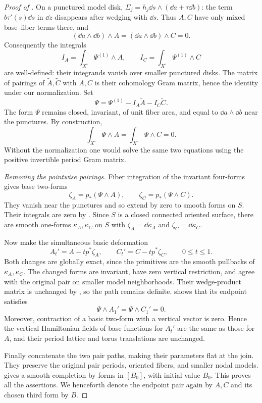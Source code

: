 \begin{proof}[Proof of ]
On a punctured model disk, $\Sigma_j=h_j\dd s\wedge(\dd a+\tau\dd b)$:
the term $b\tau'(s)\dd s$ in $\dd z$ disappears after wedging with
$\dd s$.  Thus $A,C$ have only mixed base--fiber terms there, and
\[
 (\dd a\wedge\dd b)\wedge A
 =(\dd a\wedge\dd b)\wedge C=0.
\]
Consequently the integrals
\[
 I_A=\int_{X^\circ}\Psi^{(1)}\wedge A,
 \qquad
 I_C=\int_{X^\circ}\Psi^{(1)}\wedge C
\]
are well-defined: their integrands vanish over smaller punctured
disks.  The matrix of pairings of $\widetilde A,\widetilde C$ with
$A,C$ is their cohomology Gram matrix, hence the identity under our
normalization.  Set
\begin{equation}\label{eq:regular-psi-class-correction}
 \Psi=\Psi^{(1)}-I_A\widetilde A-I_C\widetilde C.
\end{equation}
The form $\Psi$ remains closed, invariant, of unit fiber area, and
equal to $\dd a\wedge\dd b$ near the punctures.  By construction,
\begin{equation}\label{eq:regular-zero-total-pairings}
 \int_{X^\circ}\Psi\wedge A
 =\int_{X^\circ}\Psi\wedge C=0.
\end{equation}
Without the normalization one would solve the same two equations
using the positive invertible period Gram matrix.

\emph{Removing the pointwise pairings.}
Fiber integration of the invariant four-forms gives base two-forms
\[
 \zeta_A=p_*(\Psi\wedge A),\qquad
 \zeta_C=p_*(\Psi\wedge C).
\]
They vanish near the punctures and so extend by zero to smooth forms
on $S$.  Their integrals are zero by
.  Since $S$ is a closed connected
oriented surface, there are smooth one-forms $\kappa_A,\kappa_C$ on
$S$ with
$\zeta_A=\dd\kappa_A$ and $\zeta_C=\dd\kappa_C$.

Now make the simultaneous basic deformation
\begin{equation}\label{eq:regular-final-basic-path}
 A_t'=A-tp^*\zeta_A,
 \qquad C_t'=C-tp^*\zeta_C,
 \qquad 0\le t\le1.
\end{equation}
Both changes are globally exact, since the primitives are the smooth
pullbacks of $\kappa_A,\kappa_C$.  The changed forms are invariant,
have zero vertical restriction, and agree with the original pair
on smaller model neighborhoods.  Their wedge-product matrix is
unchanged by , so the path remains
definite.   shows that its endpoint
satisfies
\[
 \Psi\wedge A_1'=\Psi\wedge C_1'=0.
\]
Moreover, contraction of a basic two-form with a vertical vector is
zero.  Hence the vertical Hamiltonian fields of base functions for
$A_t'$ are the same as those for $A$, and their period lattice and
torus translations are unchanged.

Finally concatenate the two pair paths, making their parameters flat
at the join.  They preserve the original pair periods, oriented
fibers, and smaller nodal models.   gives
a smooth completion by forms in $[B_0]$, with initial value $B_0$.
This proves all the assertions.  We henceforth denote the endpoint
pair again by $A,C$ and its chosen third form by $B$.
\end{proof}
